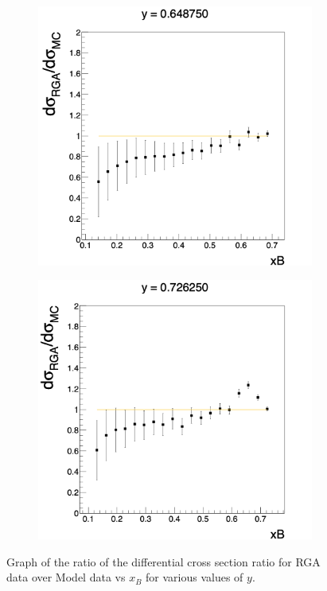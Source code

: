\begin{figure}[h!]
	\centering
	\begin{subfigure}[b]{0.40\linewidth}
		\includegraphics[width=\linewidth]{figures/rga/ratio_4.png}
		\label{fig:rga_ratio4}
	\end{subfigure}
	\begin{subfigure}[b]{0.40\textwidth}
		\includegraphics[width=\linewidth]{figures/rga/ratio_5.png}
		\label{fig:rga_ratio5}
	\end{subfigure}
	\caption{Graph of the ratio of the differential cross section ratio for RGA data over Model data vs $x_B$ for various values of $y$.}
	\label{fig:rga_ratio_plots}
\end{figure}

